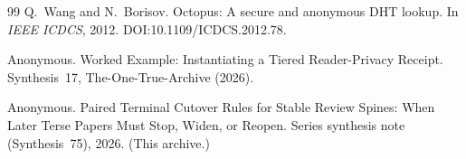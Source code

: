 \documentclass[11pt]{article}
\begin{document}
\begin{thebibliography}{99}
Q.~Wang and N.~Borisov.
\newblock Octopus: A secure and anonymous DHT lookup.
\newblock In \emph{IEEE ICDCS}, 2012.
\newblock DOI:10.1109/ICDCS.2012.78.

Anonymous.
\newblock Worked Example: Instantiating a Tiered Reader-Privacy Receipt.
\newblock Synthesis~17, The-One-True-Archive (2026).

Anonymous.
\newblock Paired Terminal Cutover Rules for Stable Review Spines: When Later Terse Papers Must Stop, Widen, or Reopen.
\newblock Series synthesis note (Synthesis~75), 2026. (This archive.)

\end{thebibliography}
\end{document}
